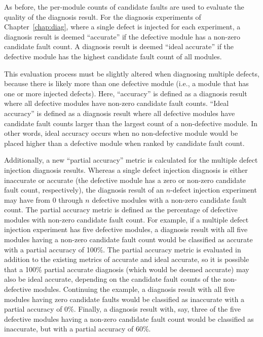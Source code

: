 As before, the per-module counts of candidate faults are used to evaluate the quality of the diagnosis result.
%
For the diagnosis experiments of Chapter~\ref{chap:diag}, where a single defect is injected for each experiment, a diagnosis result is deemed ``accurate'' if the defective module has a non-zero candidate fault count.
%
A diagnosis result is deemed ``ideal accurate'' if the defective module has the highest candidate fault count of all modules.

This evaluation process must be slightly altered when diagnosing multiple defects, because there is likely more than one defective module (i.e., a module that has one or more injected defects).
%
Here, ``accuracy'' is defined as a diagnosis result where all defective modules have non-zero candidate fault counts.
%
``Ideal accuracy'' is defined as a diagnosis result where all defective modules have candidate fault counts larger than the largest count of a non-defective module.
%
In other words, ideal accuracy occurs when no non-defective module would be placed higher than a defective module when ranked by candidate fault count.

Additionally, a new ``partial accuracy'' metric is calculated for the multiple defect injection diagnosis results.
%
Whereas a single defect injection diagnosis is either inaccurate or accurate (the defective module has a zero or non-zero candidate fault count, respectively), the diagnosis result of an $n$-defect injection experiment may have from 0 through $n$ defective modules with a non-zero candidate fault count.
%
The partial accuracy metric is defined as the percentage of defective modules with non-zero candidate fault count.
%
For example, if a multiple defect injection experiment has five defective modules, a diagnosis result with all five modules having a non-zero candidate fault count would be classified as accurate with a partial accuracy of 100\%.
%
The partial accuracy metric is evaluated in addition to the existing metrics of accurate and ideal accurate, so it is possible that a 100\% partial accurate diagnosis (which would be deemed accurate) may also be ideal accurate, depending on the candidate fault counts of the non-defective modules.
%
Continuing the example, a diagnosis result with all five modules having zero candidate faults would be classified as inaccurate with a partial accuracy of 0\%.
%
Finally, a diagnosis result with, say, three of the five defective modules having a non-zero candidate fault count would be classified as inaccurate, but with a partial accuracy of 60\%.


